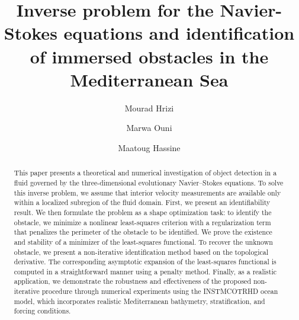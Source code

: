\documentclass[a4paper,12pt,reqno,natbib]{amsart}
\begin{document}
\title{Inverse problem for the Navier-Stokes equations and identification of immersed obstacles in the Mediterranean Sea}



\author{Mourad Hrizi}
\address[Mourad Hrizi]{Department of Mathematics, High Institute of Applied Mathematics and Informatics of Kairouan,
University of Kairouan, Avenue Assad
Iben Fourat, 3100 Kairouan, Tunisia.}

\author{Marwa Ouni}
\address[Marwa Ouni]{ University of Monastir, Faculty of Sciences of Monastir (FSM), UR13ES64, Analysis and Control of PDEs, 5019 Monastir, Tunisia.}

\author{Maatoug Hassine}
\address[Maatoug Hassine]{ University of Monastir, Faculty of Sciences of Monastir (FSM), UR13ES64, Analysis and Control of PDEs, 5019 Monastir, Tunisia.}





\begin{abstract}
This paper presents a theoretical and numerical investigation of object detection in a fluid governed by the three-dimensional evolutionary Navier--Stokes equations. To solve this inverse problem, we assume that interior velocity measurements are available only within a localized subregion of the fluid domain. First, we present an identifiability result. We then formulate the problem as a shape optimization task: to identify the obstacle, we minimize a nonlinear least-squares criterion with a regularization term that penalizes the perimeter of the obstacle to be identified. We prove the existence and stability of a minimizer of the least-squares functional. To recover the unknown obstacle, we present a non-iterative identification method based on the topological derivative. The corresponding asymptotic expansion of the least-squares functional is computed in a straightforward manner using a penalty method. Finally, as a realistic application, we demonstrate the robustness and effectiveness of the proposed non-iterative procedure through numerical experiments using the \textsc{INSTMCOTRHD} ocean model, which incorporates realistic Mediterranean bathymetry, stratification, and forcing conditions.
\end{abstract}


\end{document}
